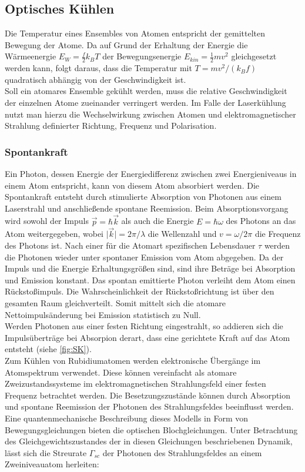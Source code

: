 \documentclass[
class=book,
accentcolor=1b,
custommargins=geometry,
fontsize=11pt,
thesis={type=Versuchsanleitung},
ruledheaders=all,
headline=false,
instbox=false,
marginpar=false,
title=small,
ignore-missing-data=true,
twoside=false,
logofile=apqdesign/tuda_logo.pdf,
pdfa=false %
]{apqpub}
\begin{document}
				\subsection{Optisches Kühlen}
				
				Die Temperatur eines Ensembles von Atomen entspricht der gemittelten Bewegung der Atome. Da auf Grund der
				Erhaltung der Energie die Wärmeenergie $E_W = \frac{f}{2}k_BT$ der Bewegungsenergie $E_{kin} = \frac{1}{2}mv^2$ gleichgesetzt werden kann, folgt daraus, dass die Temperatur mit $T = mv^2/(k_Bf)$ quadratisch abhängig von der Geschwindigkeit ist.\\ 
				Soll ein atomares Ensemble gekühlt werden, muss die relative Geschwindigkeit der einzelnen Atome zueinander
				verringert werden. Im Falle der Laserkühlung nutzt man hierzu die Wechselwirkung zwischen Atomen und
				elektromagnetischer Strahlung definierter Richtung, Frequenz und Polarisation.
				
				\subsubsection{Spontankraft}\label{ssec:SK}
				
				Ein Photon, dessen Energie der Energiedifferenz zwischen zwei Energieniveaus in einem Atom entspricht, kann von diesem Atom absorbiert werden. Die Spontankraft entsteht durch stimulierte Absorption von Photonen aus einem Laserstrahl und anschließende spontane Reemission. Beim Absorptionsvorgang wird sowohl der Impuls $\vec{p} = \hbar \vec{k}$ als auch die Energie $E = \hbar \omega$ des Photons an das Atom weitergegeben, wobei $\vert \vec{k} \vert = 2\pi/\lambda$ die Wellenzahl und $v = \omega/2\pi$ die Frequenz des Photons ist. Nach einer für die Atomart spezifischen Lebensdauer $\tau$ werden die Photonen
				wieder unter spontaner Emission vom Atom abgegeben. Da der Impuls und die Energie Erhaltungsgrößen sind,
				sind ihre Beträge bei Absorption und Emission konstant. Das spontan emittierte Photon verleiht dem Atom einen Rückstoßimpuls. Die Wahrscheinlichkeit der Rückstoßrichtung ist über den gesamten Raum gleichverteilt. Somit mittelt sich die atomare Nettoimpulsänderung bei Emission statistisch zu Null.\\ Werden Photonen aus einer festen Richtung eingestrahlt, so addieren sich die Impulsüberträge bei Absorpion derart, dass eine gerichtete Kraft auf das Atom entsteht (siehe \autoref{fig:SK}).\\
				Zum Kühlen von Rubidiumatomen werden elektronische Übergänge im Atomspektrum verwendet. Diese können
				vereinfacht als atomare Zweizustandssysteme im elektromagnetischen Strahlungsfeld einer festen Frequenz
				betrachtet werden. Die Besetzungszustände können durch Absorption und spontane Reemission der Photonen des
				Strahlungsfeldes beeinflusst werden. Eine quantenmechanische Beschreibung dieses Modells in Form von Bewegungsgleichungen bieten die optischen Blochgleichungen. Unter Betrachtung des Gleichgewichtszustandes der in diesen Gleichungen beschriebenen Dynamik, lässt sich die Streurate $\varGamma_{sc}$ der Photonen des Strahlungsfeldes an einem Zweiniveauatom herleiten:
				
\end{document}
